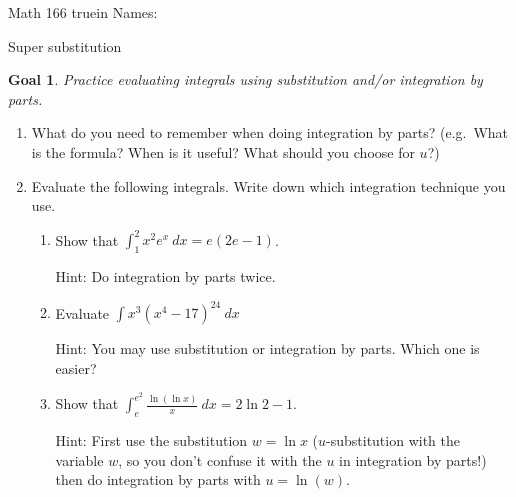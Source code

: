 \documentclass[12pt]{article}
\newtheorem*{goal}{Goal}
\begin{document}
\pagestyle{empty} %

\noindent
{Math 166  truein  Names:\ \hrulefill}

\noindent
{Super substitution}

\medskip

\begin{goal} \rm
Practice evaluating integrals using substitution and/or integration by parts.
\end{goal}

\begin{enumerate}
\item What do you need to remember when doing integration by parts? (e.g.\ What is the formula? When is it useful? What should you choose for $u$?)
\vspace{1.25in}


\item 
Evaluate the following integrals. Write down which integration technique you use.
\begin{enumerate}




\item Show that $\displaystyle\int_1^2 x^2 e^x \ dx = e(2e-1)$.

Hint: Do integration by parts twice.






\vspace{2.25in}

\item  Evaluate $\displaystyle\int x^3(x^4-17)^{24} \ dx$ 

Hint: You may use substitution or integration by parts. Which one is easier?

\pagebreak

\item Show that $\displaystyle\int_e^{e^2} \frac{\ln(\ln x)}{x} \ dx = 2\ln 2 - 1$.

Hint: First use the substitution $w=\ln x$ ($u$-substitution with the variable $w$, so you don't confuse it with the $u$ in integration by parts!) then do integration by parts with $u=\ln(w)$.



\vspace{3.5in}



\end{enumerate}
\end{enumerate}
\end{document}

